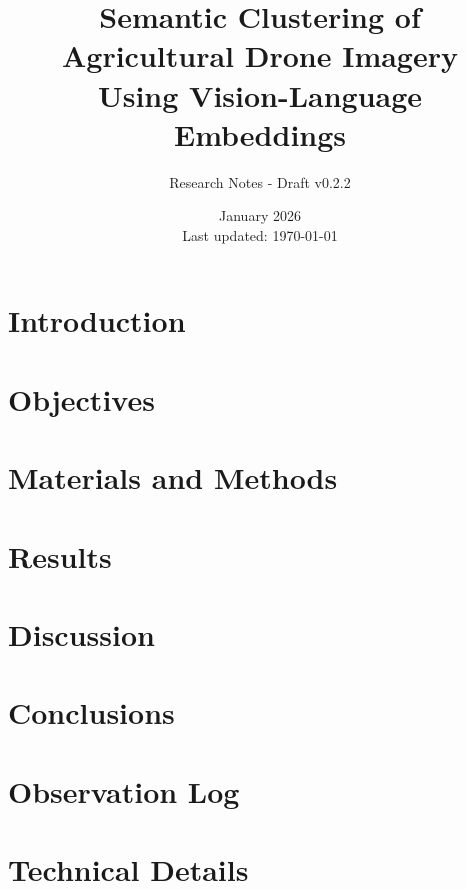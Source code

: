 \documentclass[11pt,a4paper]{article}
\title{Semantic Clustering of Agricultural Drone Imagery\\Using Vision-Language Embeddings}
\author{Research Notes - Draft v0.2.2}
\date{January 2026 \\ \small Last updated: \today}
\begin{document}
\maketitle

\begin{abstract}

\end{abstract}

\tableofcontents
\newpage

\section{Introduction}
\label{sec:introduction}


\section{Objectives}
\label{sec:objectives}


\section{Materials and Methods}
\label{sec:methods}


\section{Results}
\label{sec:results}


\section{Discussion}
\label{sec:discussion}


\section{Conclusions}
\label{sec:conclusions}


\appendix
\section{Observation Log}
\label{app:observations}


\section{Technical Details}
\label{app:technical}


% 
\end{document}
